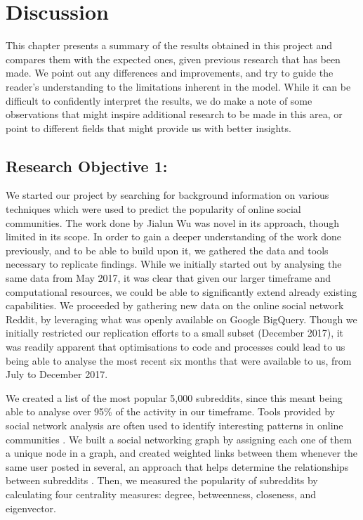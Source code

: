 \documentclass[bsc,frontabs,twoside,singlespacing,parskip,deptreport]{infthesis}
\begin{document}
\chapter{Discussion}\label{discussion}

This chapter presents a summary of the results obtained in this project and compares them with the expected ones, given previous research that has been made. We point out any differences and improvements, and try to guide the reader’s understanding to the limitations inherent in the model. While it can be difficult to confidently interpret the results, we do make a note of some observations that might inspire additional research to be made in this area, or point to different fields that might provide us with better insights. 

\section{Research Objective 1:}\label{rq1}

We started our project by searching for background information on various techniques which were used to predict the popularity of online social communities. The work done by Jialun Wu \cite{masters} was novel in its approach, though limited in its scope. In order to gain a deeper understanding of the work done previously, and to be able to build upon it, we gathered the data and tools necessary to replicate findings. While we initially started out by analysing the same data from May 2017, it was clear that given our larger timeframe and computational resources, we could be able to significantly extend already existing capabilities. We proceeded by gathering new data on the online social network Reddit, by leveraging what was openly available on Google BigQuery. Though we initially restricted our replication efforts to a small subset (December 2017), it was readily apparent that optimisations to code and processes could lead to us being able to analyse the most recent six months that were available to us, from July to December 2017.

We created a list of the most popular 5,000 subreddits, since this meant being able to analyse over 95\% of the activity in our timeframe. Tools provided by social network analysis are often used to identify interesting patterns in online communities \cite{GrandjeanMartin2016Asna} \cite{deLaat2007}. We built a social networking graph by assigning each one of them a unique node in a graph, and created weighted links between them whenever the same user posted in several, an approach that helps determine the relationships between subreddits \cite{OtteEvelien2002Snaa}. Then, we measured the popularity of subreddits by calculating four centrality measures: degree, betweenness, closeness, and eigenvector.
\end{document}
